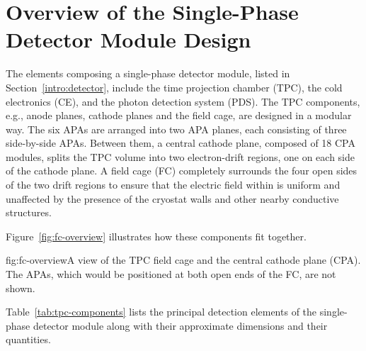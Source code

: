 \chapter{Overview of the Single-Phase Detector Module Design}
\label{ch:fdsp-ov}



The elements composing a single-phase detector module, listed in Section~\ref{intro:detector}, include the time projection chamber (TPC), the cold electronics (CE), and the photon detection system (PDS).  The TPC components, e.g., anode planes, cathode planes and the field cage, are designed in a modular way.  
The six APAs are arranged into two APA planes, each consisting of three side-by-side APAs. Between them,  
a central cathode plane, composed of 18 CPA modules, splits the TPC volume into two electron-drift regions, one on each side of the cathode plane. 
A field cage (FC) completely surrounds the four
open sides of the two drift regions to ensure that the electric field within is uniform and unaffected by the presence of the cryostat walls and other nearby conductive structures. 

Figure~\ref{fig:fc-overview} illustrates how these components fit together.


\begin{dunefigure}{fig:fc-overview}{A view of the TPC field cage and the central cathode plane (CPA). The APAs, which would be positioned at both open ends of the FC, are not shown.}
\end{dunefigure}

Table~\ref{tab:tpc-components} lists the principal detection elements of the single-phase detector module along with their approximate dimensions and their quantities. 

